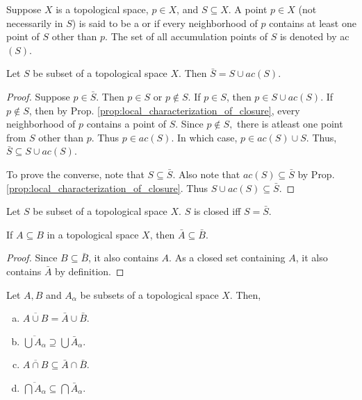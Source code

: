 \documentclass[11pt,a4paper]{article}
\begin{document}
\begin{mydef}
Suppose $X$ is a topological space, $p\in X$, and $S\subseteq X$. A point $p\in X$ (not necessarily in $S$) is said to be a  or  if every neighborhood of $p$ contains at least one point of $S$ other than $p$. The set of all accumulation points of $S$ is denoted by ac$(S)$.
\end{mydef}

\begin{prop}
Let $S$ be subset of a topological space $X$. Then $\bar{S} = S\cup ac(S)$.
\end{prop}

\begin{proof}
Suppose $p\in \bar{S}$. Then $p\in S$ or $p\notin S$. If $p\in S$, then $p\in S\cup ac(S)$. If $p\notin S$, then by Prop. \ref{prop:local_characterization_of_closure}, every neighborhood of $p$ contains a point of $S$. Since $p\notin S,$ there is atleast one point from $S$ other than $p$. Thus $p\in ac(S)$. In which case, $p\in ac(S)\cup S$. Thus, $\bar{S}\subseteq S\cup ac(S)$.

To prove the converse, note that $S\subseteq \bar{S}$. Also note that $ac(S)\subseteq \bar{S}$ by Prop. \ref{prop:local_characterization_of_closure}. Thus $S\cup ac(S)\subseteq \bar{S}$.
\end{proof}

\begin{prop}
Let $S$ be subset of a topological space $X$. $S$ is closed iff $S = \bar{S}$.
\end{prop}

\begin{prop}\label{prop:subsets_closure}
If $A\subseteq B$ in a topological space $X$, then $\bar{A}\subseteq\bar{B}$.
\end{prop}

\begin{proof}
Since $B\subseteq \bar{B}$, it also contains $A$. As a closed set containing $A$, it also contains $\bar{A}$ by definition. 
\end{proof}

\begin{prop}
Let $A, B$ and $A_\alpha$ be subsets of a topological space $X$. Then,
\begin{enumerate}[(a)]
    \item $\overline{A\cup B} = \bar{A}\cup \bar{B}$.
    \item $\overline{\bigcup A_\alpha} \supseteq \bigcup \bar{A}_\alpha$.
    \item $\overline{A\cap B} \subseteq \bar{A}\cap \bar{B}$.
    \item $\overline{\bigcap A_\alpha} \subseteq \bigcap \bar{A}_\alpha$.
\end{enumerate}
\end{prop}
\end{document}

